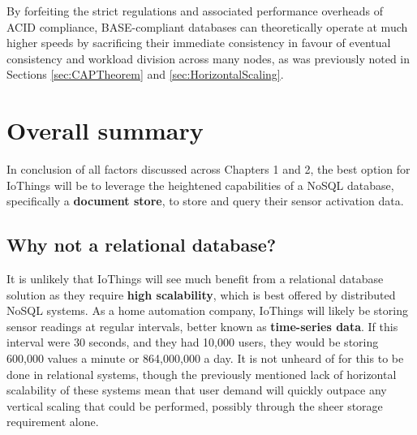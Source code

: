 \noindent By forfeiting the strict regulations and associated performance overheads of ACID compliance, BASE-compliant databases can 
theoretically operate at much higher speeds by sacrificing their immediate consistency in favour of eventual consistency and workload
division across many nodes, as was previously noted in Sections \ref{sec:CAPTheorem} and \ref{sec:HorizontalScaling}.



\section{Overall summary}
In conclusion of all factors discussed across Chapters 1 and 2, the best option for IoThings will be to leverage the heightened capabilities
of a NoSQL database, specifically a \textbf{document store}, to store and query their sensor activation data.

\subsection{Why not a relational database?}
It is unlikely that IoThings will see much benefit from a relational database solution as they require \textbf{high scalability}, which is 
best offered by distributed NoSQL systems. As a home automation company, IoThings will likely be storing sensor readings at regular intervals,
better known as \textbf{time-series data}. If this interval were 30 seconds, and they had 10,000 users, they would be storing 600,000 values 
a minute or 864,000,000 a day. It is not unheard of for this to be done in relational systems, though the previously mentioned lack 
of horizontal scalability of these systems mean that user demand will quickly outpace any vertical scaling that could be performed,
possibly through the sheer storage requirement alone.

